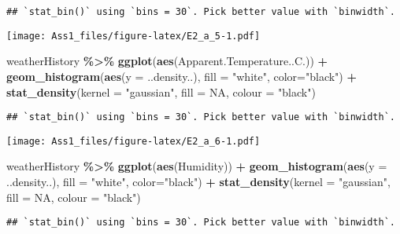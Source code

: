 \documentclass[
]{article}
\newenvironment{Shaded}{\begin{snugshade}}{\end{snugshade}}
\newcommand{\AttributeTok}[1]{\textcolor[rgb]{0.13,0.29,0.53}{#1}}
\newcommand{\ConstantTok}[1]{\textcolor[rgb]{0.56,0.35,0.01}{#1}}
\newcommand{\FunctionTok}[1]{\textcolor[rgb]{0.13,0.29,0.53}{\textbf{#1}}}
\newcommand{\NormalTok}[1]{#1}
\newcommand{\SpecialCharTok}[1]{\textcolor[rgb]{0.81,0.36,0.00}{\textbf{#1}}}
\newcommand{\StringTok}[1]{\textcolor[rgb]{0.31,0.60,0.02}{#1}}
\begin{document}
\begin{verbatim}
## `stat_bin()` using `bins = 30`. Pick better value with `binwidth`.
\end{verbatim}

\texttt{[image: Ass1\_files/figure-latex/E2\_a\_5-1.pdf]}

\begin{Shaded}
\begin{Highlighting}[]
\NormalTok{weatherHistory }\SpecialCharTok{\%\textgreater{}\%}
  \FunctionTok{ggplot}\NormalTok{(}\FunctionTok{aes}\NormalTok{(Apparent.Temperature..C.)) }\SpecialCharTok{+}
  \FunctionTok{geom\_histogram}\NormalTok{(}\FunctionTok{aes}\NormalTok{(}\AttributeTok{y =}\NormalTok{ ..density..), }\AttributeTok{fill =} \StringTok{"white"}\NormalTok{, }\AttributeTok{color=}\StringTok{"black"}\NormalTok{) }\SpecialCharTok{+}
  \FunctionTok{stat\_density}\NormalTok{(}\AttributeTok{kernel =} \StringTok{"gaussian"}\NormalTok{, }\AttributeTok{fill =} \ConstantTok{NA}\NormalTok{, }\AttributeTok{colour =} \StringTok{"black"}\NormalTok{)}
\end{Highlighting}
\end{Shaded}

\begin{verbatim}
## `stat_bin()` using `bins = 30`. Pick better value with `binwidth`.
\end{verbatim}

\texttt{[image: Ass1\_files/figure-latex/E2\_a\_6-1.pdf]}

\begin{Shaded}
\begin{Highlighting}[]
\NormalTok{weatherHistory }\SpecialCharTok{\%\textgreater{}\%}
  \FunctionTok{ggplot}\NormalTok{(}\FunctionTok{aes}\NormalTok{(Humidity)) }\SpecialCharTok{+}
  \FunctionTok{geom\_histogram}\NormalTok{(}\FunctionTok{aes}\NormalTok{(}\AttributeTok{y =}\NormalTok{ ..density..), }\AttributeTok{fill =} \StringTok{"white"}\NormalTok{, }\AttributeTok{color=}\StringTok{"black"}\NormalTok{) }\SpecialCharTok{+}
  \FunctionTok{stat\_density}\NormalTok{(}\AttributeTok{kernel =} \StringTok{"gaussian"}\NormalTok{, }\AttributeTok{fill =} \ConstantTok{NA}\NormalTok{, }\AttributeTok{colour =} \StringTok{"black"}\NormalTok{)}
\end{Highlighting}
\end{Shaded}

\begin{verbatim}
## `stat_bin()` using `bins = 30`. Pick better value with `binwidth`.
\end{verbatim}
\end{document}
